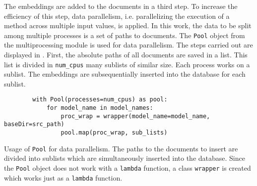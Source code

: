 
The embeddings are added to the documents in a third step.
To increase the efficiency of this step, data parallelism, i.e. parallelizing the execution of a method across multiple input values, is applied.
In this work, the data to be split among multiple processes is a set of paths to documents.
The \texttt{Pool} object from the multiprocessing module is used for data parallelism.
The steps carried out are displayed in .
First, the absolute paths of all documents are saved in a list.
This list is divided in \texttt{num\_cpus} many sublists of similar size.
Each process works on a sublist.
The embeddings are subsequentially inserted into the database for each sublist. 

\begin{listing}[htp]
    \begin{verbatim}
        with Pool(processes=num_cpus) as pool:
            for model_name in model_names:
                proc_wrap = wrapper(model_name=model_name, baseDir=src_path)
                pool.map(proc_wrap, sub_lists)
    \end{verbatim}
    \caption[Usage of \texttt{Pool} for data parallelism]
    {Usage of \texttt{Pool} for data parallelism.
    The paths to the documents to insert are divided into sublists which are simultaneously inserted into the database.
    Since the \texttt{Pool} object does not work with a \texttt{lambda} function, 
    a class \texttt{wrapper} is created which works just as a \texttt{lambda} function.
    }
    \label{lst:db_Pool_embeddings}
\end{listing}


